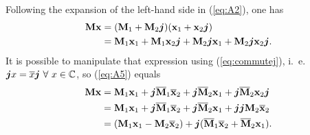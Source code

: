 \documentclass[
	11pt,				%
	openright,			%
	twoside,			%
	a4paper,			%
	french,				%
	brazil,			%
	english				%
	]{abntex2}
\begin{document}
\begin{apendicesenv}
Following the expansion of the left-hand side in (\ref{eq:A2}), one has
\begin{equation}
\begin{aligned}
\label{eq:A5}
\mathbf{M} \mathbf{x} &= (\mathbf{M}_1 + \mathbf{M}_2 \boldsymbol{j})(\mathbf{x}_1 + \mathbf{x}_2 \boldsymbol{j}) \\
&=\mathbf{M}_1 \mathbf{x}_1 + \mathbf{M}_1 \mathbf{x}_2 \boldsymbol{j} + \mathbf{M}_2 \boldsymbol{j} \mathbf{x}_1 + \mathbf{M}_2 \boldsymbol{j} \mathbf{x}_2 \boldsymbol{j}.
\end{aligned}
\end{equation}
It is possible to manipulate that expression using (\ref{eq:commutej}), i.~e. $ \boldsymbol{j} x = \overline{x} \boldsymbol{j} \ \forall \ x \in \mathbb{C}$, so (\ref{eq:A5}) equals
\begin{equation}
\begin{aligned}
\label{eq:A7}
\mathbf{M} \mathbf{x} &= \mathbf{M}_1 \mathbf{x}_1 + \boldsymbol{j} \overline{\mathbf{M}}_1 \overline{\mathbf{x}}_2 + \boldsymbol{j} \overline{\mathbf{M}}_2 \mathbf{x}_1 + \boldsymbol{j} \overline{\mathbf{M}}_2 \mathbf{x}_2 \boldsymbol{j} \\
&= \mathbf{M}_1 \mathbf{x}_1 + \boldsymbol{j} \overline{\mathbf{M}}_1 \overline{\mathbf{x}}_2 + \boldsymbol{j} \overline{\mathbf{M}}_2 \mathbf{x}_1 + \boldsymbol{j}\boldsymbol{j} \mathbf{M}_2 \overline{\mathbf{x}}_2 \\
&= (\mathbf{M}_1 \mathbf{x}_1 - \mathbf{M}_2 \overline{\mathbf{x}}_2) + \boldsymbol{j} (\overline{\mathbf{M}}_1 \overline{\mathbf{x}}_2 + \overline{\mathbf{M}}_2 \mathbf{x}_1).
\end{aligned}
\end{equation}


\end{apendicesenv}
\end{document}
